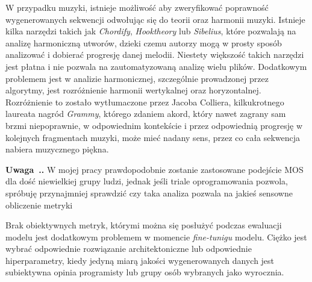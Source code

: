 \documentclass[data-science]{agh-wi} %
\newcounter{comment}[chapter]
\newenvironment{comment}[1][]{\begin{shaded}\refstepcounter{comment}
\noindent \textbf{Uwaga~\thechapter.\thecomment. #1} \rmfamily}{\end{shaded}}
\begin{document}
W przypadku muzyki, istnieje możliwość aby zweryfikować poprawność wygenerowanych sekwencji odwołując się do teorii oraz harmonii muzyki. Istnieje kilka narzędzi takich jak \textit{Chordify}, \textit{Hooktheory} lub \textit{Sibelius}, które pozwalają na analizę harmoniczną utworów, dzieki czemu autorzy mogą w prosty sposób analizować i dobierać progresję danej melodii. Niestety większość takich narzędzi jest płatna i nie pozwala na zautomatyzowaną analizę wielu plików. Dodatkowym problemem jest w analizie harmonicznej, szczególnie prowadzonej przez algorytmy, jest rozróżnienie harmonii wertykalnej oraz horyzontalnej. Rozróżnienie to zostało wytłumaczone przez Jacoba Colliera, kilkukrotnego laureata nagród \textit{Grammy}, którego zdaniem akord, który nawet zagrany sam brzmi niepoprawnie, w odpowiednim kontekście i przez odpowiednią progresję w kolejnych fragmentach muzyki, może mieć nadany sens, przez co cała sekwencja nabiera muzycznego piękna\cite{collier_wrongnote}.
\begin{comment}
W mojej pracy prawdopodobnie zostanie zastosowane podejście MOS dla dość niewielkiej grupy ludzi, jednak jeśli triale oprogramowania pozwola, spróbuję przynajmniej sprawdzić czy taka analiza pozwala na jakieś sensowne obliczenie metryki
\end{comment}
Brak obiektywnych metryk, którymi można się posłużyć podczas ewaluacji modelu jest dodatkowym problemem w momencie \textit{fine-tunigu} modelu. Ciężko jest wybrać odpowiednie rozwiązanie architektoniczne lub odpowiednie hiperparametry, kiedy jedyną miarą jakości wygenerowanych danych jest subiektywna opinia programisty lub grupy osób wybranych jako wyrocznia.
\end{document}
